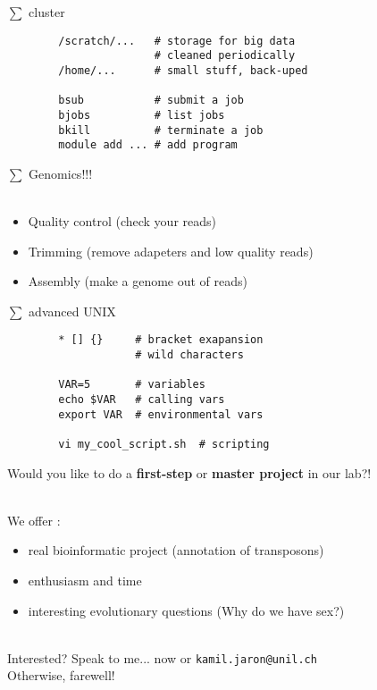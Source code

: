 \documentclass[xcolor=dvipsnames]{beamer}
\begin{document}
\begin{frame}[fragile]
	\Huge
	$\sum$ cluster
	\Large
	\begin{verbatim}
		/scratch/...   # storage for big data
		               # cleaned periodically
		/home/...      # small stuff, back-uped

		bsub           # submit a job
		bjobs          # list jobs
		bkill          # terminate a job
		module add ... # add program
	\end{verbatim}
\end{frame}

\begin{frame}[fragile]
	\Huge
	$\sum$ Genomics!!! \\
	~ \\
	\Large
	\begin{itemize}
		\item Quality control (check your reads)
		\item Trimming (remove adapeters and low quality reads)
		\item Assembly (make a genome out of reads)
	\end{itemize}
\end{frame}

\begin{frame}[fragile]
	\Huge
	$\sum$ advanced UNIX
	\Large
	\begin{verbatim}
		* [] {}     # bracket exapansion
		            # wild characters

		VAR=5       # variables
		echo $VAR   # calling vars
		export VAR  # environmental vars

		vi my_cool_script.sh  # scripting
	\end{verbatim}
\end{frame}

\begin{frame}[fragile]
	\begin{center}
		\Large
		Would you like to do a \textbf{first-step} or \textbf{master project} in our lab?!\\
	\end{center}
	~\\
	We offer :
		\begin{itemize}
			\item real bioinformatic project (annotation of transposons)
			\item enthusiasm and time
			\item interesting evolutionary questions (Why do we have sex?)
		\end{itemize}
	~\\
	Interested? Speak to me... now or \verb!kamil.jaron@unil.ch!
	~\\
	Otherwise, farewell!
\end{frame}
\end{document}
